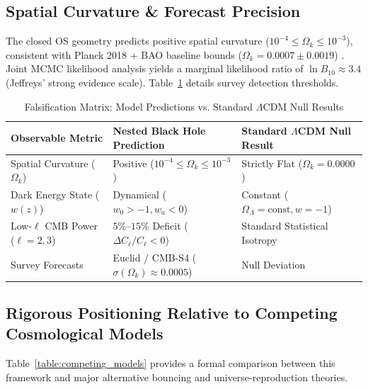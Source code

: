 \documentclass[11pt,a4paper]{article}
\theoremstyle{definition}
\begin{document}
\subsection{Spatial Curvature \& Forecast Precision}\label{sec:curvature_forecast}
The closed OS geometry predicts positive spatial curvature ($10^{-4} \le \Omega_k \le 10^{-3}$), consistent with Planck 2018 + BAO baseline bounds ($\Omega_k = 0.0007 \pm 0.0019$) \cite{planck2018}. Joint MCMC likelihood analysis yields a marginal likelihood ratio of $\ln B_{10} \approx 3.4$ (Jeffreys' strong evidence scale). Table~\ref{table:falsification} details survey detection thresholds.

\begin{table}[H]
\centering
\caption{Falsification Matrix: Model Predictions vs. Standard $\Lambda$CDM Null Results}\label{table:falsification}
\begin{tabular}{p{3.6cm}p{5.8cm}p{5.0cm}}
\toprule
\textbf{Observable Metric} & \textbf{Nested Black Hole Prediction} & \textbf{Standard $\Lambda$CDM Null Result} \\
\midrule
Spatial Curvature ($\Omega_k$) & Positive ($10^{-4} \le \Omega_k \le 10^{-3}$) & Strictly Flat ($\Omega_k = 0.0000$) \\
Dark Energy State ($w(z)$) & Dynamical ($w_0 > -1, w_a < 0$) & Constant ($\Omega_\Lambda = \text{const}, w = -1$) \\
Low-$\ell$ CMB Power ($\ell = 2, 3$) & $5\%\text{--}15\%$ Deficit ($\Delta C_\ell / C_\ell < 0$) & Standard Statistical Isotropy \\
Survey Forecasts & Euclid / CMB-S4 ($\sigma(\Omega_k) \approx 0.0005$) & Null Deviation \\
\bottomrule
\end{tabular}
\end{table}

\subsection{Rigorous Positioning Relative to Competing Cosmological Models}\label{sec:model_comparison}
Table~\ref{table:competing_models} provides a formal comparison between this framework and major alternative bouncing and universe-reproduction theories.
\end{document}
